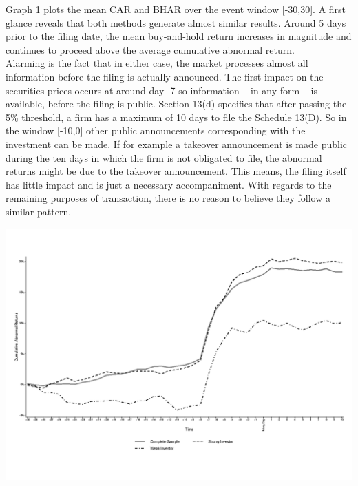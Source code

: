 \documentclass[12pt]{article}
\begin{document}
Graph 1 plots the mean CAR and BHAR over the event window [-30,30]. A first glance reveals that both methods generate almost similar results. Around 5 days prior to the filing date, the mean buy-and-hold return increases in magnitude and continues to proceed above the average cumulative abnormal return.\\
Alarming is the fact that in either case, the market processes almost all information before the filing is actually announced. The first impact on the securities prices occurs at around day -7 so information -- in any form -- is available, before the filing is public. 
Section 13(d) specifies that after passing the 5\% threshold, a firm has a maximum of 10 days to file the Schedule 13(D). So in the window [-10,0] other public announcements corresponding with the investment can be made. If for example a takeover announcement is made public during the ten days in which the firm is not obligated to file, the abnormal returns might be due to the takeover announcement. This means, the filing itself has little impact and is just a necessary accompaniment.  With regards to the remaining purposes of transaction, there is no reason to believe they follow a similar pattern. 
\begin{table}
	\centering
	\begin{adjustbox}{max width=\textwidth}
		\includegraphics{Abnormal_Returns.eps} \label{AR}
	\end{adjustbox}
\end{table}
\end{document}
